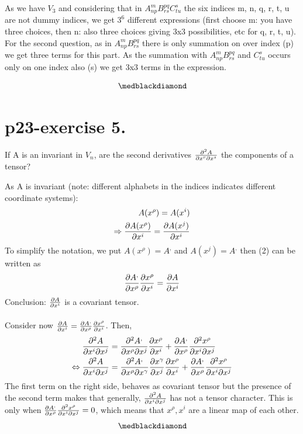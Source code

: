 As we have $V_{3}$ and considering that in $A^{m}_{np} B^{pq}_{rs}C^{s}_{tu}$ the six indices m, n, q, r, t, u are not dummy indices, we get $3^{6}$ different expressions (first choose m: you have three choices, then n: also three choices giving 3x3 possibilities, etc for q, r, t, u).\\
For the second question, as in $A^{m}_{np} B^{pq}_{rs}$ there is only summation on over index (p) we get three terms for this part. As the summation with $A^{m}_{np} B^{pq}_{rs}$ and $C^{s}_{tu}$ occurs only on one index also (s) we get 3x3 terms in the expression.

$$\medblackdiamond$$
\pagebreak[4]

\section{p23-exercise 5.}
\begin{tcolorbox}
If A  is an invariant in $V_{n}$, are the second derivatives $\pdv{A}{x^{r}}{x^{s}}$ the components of a tensor?
\end{tcolorbox}

As A is invariant (note: different alphabets in the indices indicates different coordinate systems):
\begin{align}
\ A(x^{\rho}) = A(x^{i})\\
\Rightarrow \pdv{A(x^{\rho})}{x^{i}} = \pdv{A(x^{j})}{x^{i}}
\end{align}
To simplify the notation, we put $A(x^{\rho}) = A^{,}$ and $A(x^{j}) = A^{,}$ then (2) can be written as
\begin{align}
\pdv{A^{,}}{x^{\rho}}\pdv{x^{\rho}}{x^{i}} = \pdv{A}{x^{i}}
 \end{align}
 Conclusion: $\pdv{A}{x^{i}}$ is a covariant tensor. \\\\Consider now $\pdv{A}{x^{i}} = \pdv{A^{,}}{x^{\rho}}\pdv{x^{\rho}}{x^{i}}$. Then,
\begin{align}
\pdv{A}{x^{i}}{x^{j}} &= \pdv{A^{,}}{x^{\rho}}{x^{j}}\pdv{x^{\rho}}{x^{i}}+ \pdv{A^{,}}{x^{\rho}}\pdv{x^{\rho}}{x^{i}}{x^{j}}\\
\Leftrightarrow \pdv{A}{x^{i}}{x^{j}} &= \pdv{A^{,}}{x^{\rho}}{x^{\gamma}}\pdv{x^{\gamma}}{x^{j}}\pdv{x^{\rho}}{x^{i}}+ \pdv{A^{,}}{x^{\rho}}\pdv{x^{\rho}}{x^{i}}{x^{j}}
\end{align}
The first term on the right side, behaves as covariant tensor but the presence of the second term makes that generally, $\pdv{A}{x^{i}}{x^{j}}$ has not a tensor character. This is only when $\pdv{A^{,}}{x^{\rho}}\pdv{x^{\rho}}{x^{i}}{x^{j}}=0$, which means that $x^{\rho}, x^{i}$ are a linear map of each other.
$$\medblackdiamond$$
\pagebreak[4]

